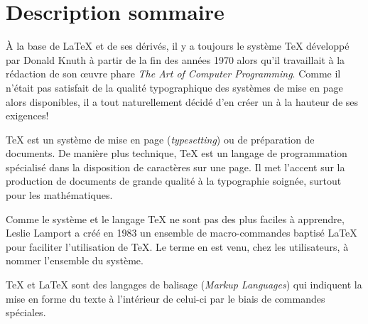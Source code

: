 \section{Description sommaire}
\label{sec:presentation:description}

À la base de {\LaTeX} et de ses dérivés, il y a toujours le système
{\TeX} développé par Donald Knuth à partir de la fin des années 1970
alors qu'il travaillait à la rédaction de son {\oe}uvre phare
\emph{The Art of Computer Programming}. Comme il n'était pas satisfait
de la qualité typographique des systèmes de mise en page alors
disponibles, il a tout naturellement décidé d'en créer un à la hauteur
de ses exigences!

{\TeX} est un système de mise en page (\emph{typesetting}) ou de
préparation de documents. De manière plus technique, {\TeX} est un
langage de programmation spécialisé dans la disposition de caractères
sur une page. Il met l'accent sur la production de documents de grande
qualité à la typographie soignée, surtout pour les mathématiques.

Comme le système et le langage {\TeX} ne sont pas des plus faciles à
apprendre, Leslie Lamport a créé en 1983 un ensemble de
macro-commandes baptisé {\LaTeX} pour faciliter l'utilisation de
{\TeX}. Le terme en est venu, chez les utilisateurs, à nommer
l'ensemble du système.

{\TeX} et {\LaTeX} sont des langages de balisage (\emph{Markup
  Languages}) qui indiquent la mise en forme du texte à l'intérieur de
celui-ci par le biais de commandes spéciales.

